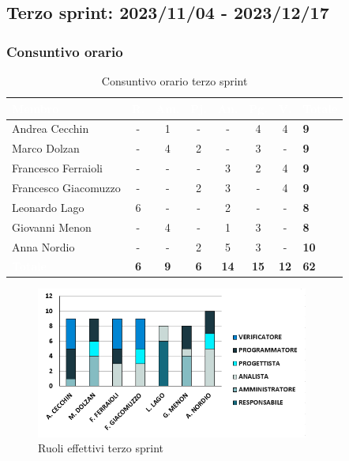 \subsection{Terzo sprint: 2023/11/04 - 2023/12/17}

\subsubsection{Consuntivo orario}
{
\setlength{\tabcolsep}{10pt}
\renewcommand{\arraystretch}{1.5}
\begin{table}[h!]
    \centering
    \begin{tabularx}{\textwidth}{| l | c | c | c | c | c | c | X |}
        \hline
        \rowcolor{headerrow} \textbf{\textcolor{white}{Membro}} & \textbf{\textcolor{white}{R.}} & \textbf{\textcolor{white}{Am.}} & \textbf{\textcolor{white}{Pj.}} & \textbf{\textcolor{white}{An.}} & \textbf{\textcolor{white}{Pg.}} & \textbf{\textcolor{white}{V.}} & \textbf{\textcolor{white}{Totale}} \\
        \hline
        Andrea Cecchin & - & 1 & - & - & 4 & 4 & \textbf{9} \\
        \hline
        Marco Dolzan & - & 4 & 2 & - & 3 & - & \textbf{9} \\
        \hline
        Francesco Ferraioli & - & - & - & 3 & 2 & 4 & \textbf{9} \\
        \hline  
        Francesco Giacomuzzo & - & - & 2 & 3 & - & 4 & \textbf{9} \\
        \hline
        Leonardo Lago & 6 & - & - & 2 & - & - & \textbf{8} \\
        \hline
        Giovanni Menon & - & 4 & - & 1 & 3 & - & \textbf{8} \\
        \hline
        Anna Nordio & - & - & 2 & 5 & 3 & - & \textbf{10} \\
        \hline
    \cellcolor{headerrow} \textbf{\textcolor{white}{Totale}} & \textbf{6} & \textbf{9} & \textbf{6} & \textbf{14} & \textbf{15} & \textbf{12} & \textbf{62} \\
        \hline
    \end{tabularx} 
    \caption{Consuntivo orario terzo sprint}
    \label{tab:consuntivoorarioterzosprint}
\end{table}
}

\begin{figure}[h!]
    \centering
    \includegraphics[width=0.8\textwidth]{cons3ruoli.png}
    \caption{Ruoli effettivi terzo sprint}
    \label{fig:consuntivoorarioterzosprint}
\end{figure}

